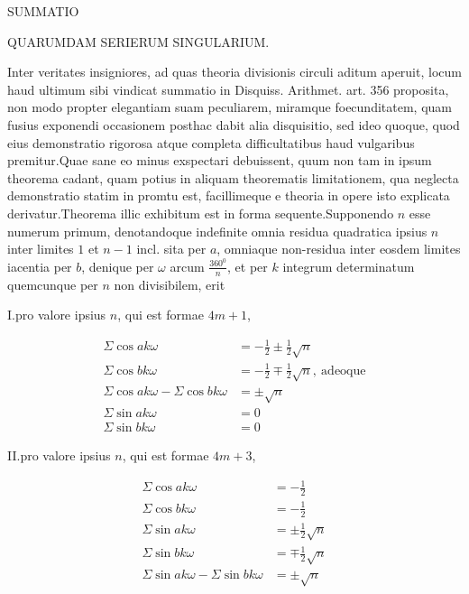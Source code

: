 \begin{center}\Large SUMMATIO\end{center}

\begin{center}\large QUARUMDAM SERIERUM SINGULARIUM.\end{center}

\BookRule{22mm}


Inter veritates insigniores, ad quas theoria divisionis circuli aditum aperuit, locum haud ultimum sibi vindicat summatio in Disquiss. Arithmet. art. 356 proposita, non modo propter elegantiam suam peculiarem, miramque foecunditatem, quam fusius exponendi occasionem posthac dabit alia disquisitio, sed ideo quoque, quod eius demonstratio rigorosa atque completa difficultatibus haud vulgaribus premitur.\quad Quae sane eo minus exspectari debuissent, quum non tam in ipsum theorema cadant, quam potius in aliquam theorematis limitationem, qua neglecta demonstratio statim in promtu est, facillimeque e theoria in opere isto explicata derivatur.\quad Theorema illic exhibitum est in forma sequente.\quad Supponendo $n$ esse numerum primum, denotandoque indefinite omnia residua quadratica ipsius $n$ inter limites $1$ et $n-1$ incl. sita per $a$, omniaque non-residua inter eosdem limites iacentia per $b$, denique per $\omega$ arcum $\frac{360^{0}}{n}$, et per $k$ integrum determinatum quemcunque per $n$ non divisibilem, erit

I.\quad pro valore ipsius $n$, qui est formae $4m+1$,

\[
\begin{aligned}
\Sigma\cos ak\omega&=-\tfrac12\pm\tfrac12\surd n\\
\Sigma\cos bk\omega&=-\tfrac12\mp\tfrac12\surd n,\ \text{adeoque}\\
\Sigma\cos ak\omega-\Sigma\cos bk\omega&=\pm\surd n\\
\Sigma\sin ak\omega&=0\\
\Sigma\sin bk\omega&=0
\end{aligned}
\]

II.\quad pro valore ipsius $n$, qui est formae $4m+3$,

\[
\begin{aligned}
\Sigma\cos ak\omega&=-\tfrac12\\
\Sigma\cos bk\omega&=-\tfrac12\\
\Sigma\sin ak\omega&=\pm\tfrac12\surd n\\
\Sigma\sin bk\omega&=\mp\tfrac12\surd n\\
\Sigma\sin ak\omega-\Sigma\sin bk\omega&=\pm\surd n
\end{aligned}
\]

